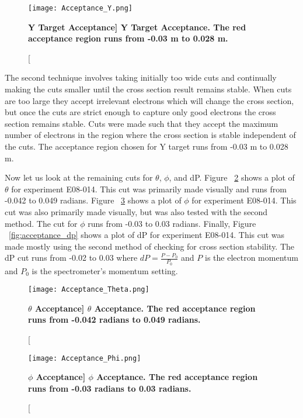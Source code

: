 \begin{figure}[!ht]
\begin{center}
\texttt{[image: Acceptance\_Y.png]}
\end{center}
\caption[\bf{Y Target Acceptance}]{
{\bf{Y Target Acceptance.}} The red acceptance region runs from -0.03 m to 0.028 m.}
\label{fig:acceptance_y}
\end{figure}

The second technique involves taking initially too wide cuts and continually making the cuts smaller until the cross section result remains stable. When cuts are too large they accept irrelevant electrons which will change the cross section, but once the cuts are strict enough to capture only good electrons the cross section remains stable. Cuts were made such that they accept the maximum number of electrons in the region where the cross section is stable independent of the cuts. The acceptance region chosen for Y target runs from -0.03 m to 0.028 m.

Now let us look at the remaining cuts for $\theta$, $\phi$, and dP. Figure ~\ref{fig:acceptance_th} shows a plot of $\theta$ for experiment E08-014. This cut was primarily made visually and runs from -0.042 to 0.049 radians. Figure ~\ref{fig:acceptance_ph} shows a plot of $\phi$ for experiment E08-014. This cut was also primarily made visually, but was also tested with the second method. The cut for $\phi$ runs from -0.03 to 0.03 radians. Finally, Figure ~\ref{fig:acceptance_dp} shows a plot of dP for experiment E08-014. This cut was made mostly using the second method of checking for cross section stability. The dP cut runs from -0.02 to 0.03 where $dP = \frac{P-P_0}{P_0}$ and $P$ is the electron momentum and $P_0$ is the spectrometer's momentum setting.

\begin{figure}[!ht]
\begin{center}
\texttt{[image: Acceptance\_Theta.png]}
\end{center}
\caption[\bf{$\theta$ Acceptance}]{
{\bf{$\theta$ Acceptance.}} The red acceptance region runs from -0.042 radians to 0.049 radians.}
\label{fig:acceptance_th}
\end{figure}

\begin{figure}[!ht]
\begin{center}
\texttt{[image: Acceptance\_Phi.png]}
\end{center}
\caption[\bf{$\phi$ Acceptance}]{
{\bf{$\phi$ Acceptance.}} The red acceptance region runs from -0.03 radians to 0.03 radians.}
\label{fig:acceptance_ph}
\end{figure}

